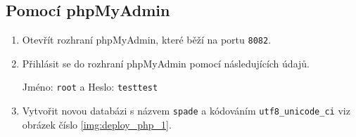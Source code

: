 \documentclass[czech,DP]{thesiskiv}
\begin{document}
\subsection{Pomocí phpMyAdmin}
\begin{enumerate}
    \item Otevřít rozhraní phpMyAdmin, které běží na portu \texttt{8082}.
    \item Přihlásit se do rozhraní phpMyAdmin pomocí následujících údajů.
    \begin{center}
    Jméno: \verb|root|
    a
    Heslo: \verb|testtest|
    \end{center}
    \item Vytvořit novou databázi s názvem \texttt{spade} a kódováním \texttt{utf8\_unicode\_ci} viz obrázek číslo \ref{img:deploy_php_1}.
    

\end{enumerate}
\end{document}

